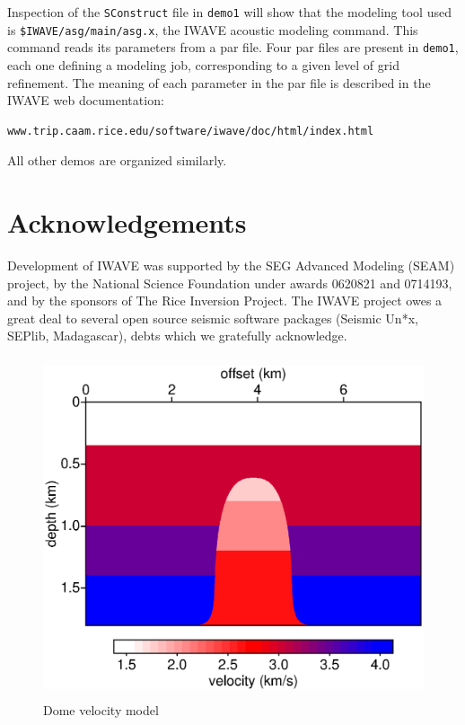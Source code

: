 \documentclass [12pt]{georeport}
\begin{document}
Inspection of the {\tt SConstruct} file in {\tt demo1} will show that
the modeling tool used is {\tt \$IWAVE/asg/main/asg.x}, the IWAVE
acoustic modeling command. This command reads its parameters from a
par file. Four par files are present in {\tt demo1}, each one defining
a modeling job, corresponding to a given level of grid refinement. The
meaning of each parameter in the par file is described in the IWAVE
web documentation:
\begin{verbatim}
www.trip.caam.rice.edu/software/iwave/doc/html/index.html
\end{verbatim}
All other demos are organized similarly.

\section{Acknowledgements}
Development of IWAVE was supported by the SEG Advanced Modeling (SEAM) project, by the National Science Foundation under awards 0620821 and 0714193, and by the sponsors of The Rice Inversion Project. The IWAVE project owes a great deal to several open source seismic software packages (Seismic Un*x, SEPlib, Madagascar), debts which we gratefully acknowledge. 



\newpage

\begin{figure}
\label{fig1}
\includegraphics[height=10cm,width=15cm]{./Fig/fig1.ps}
\caption{Dome velocity model}
\end{figure}
\end{document}

